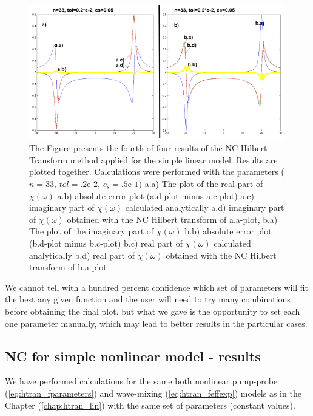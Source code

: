 \documentclass[12pt,twoside,a4paper]{article}
\numberwithin{equation}{subsection}
\numberwithin{figure}{subsection}
\begin{document}
\begin{figure}
  \includegraphics[width=150mm]{img/nc_lin4.png}
  \caption{The Figure presents the fourth of four results of the NC Hilbert Transform method applied for the simple linear model. Results are plotted together. Calculations were performed with the parameters ($n = 33, \, tol = \mbox{.2e-2}, \, c_s = \mbox{.5e-1}) $
    a.a) The plot of the real part of $\chi (\omega )$
    a.b) absolute error plot (a.d-plot minus a.c-plot) 
    a.c) imaginary part of $\chi (\omega )$ calculated analytically 
    a.d) imaginary part of $\chi (\omega )$ obtained with the NC Hilbert transform of a.a-plot,
    b.a) The plot of the imaginary part of $\chi (\omega )$
    b.b) absolute error plot (b.d-plot minus b.c-plot) 
    b.c) real part of $\chi (\omega )$ calculated analytically 
    b.d) real part of $\chi (\omega )$ obtained with the NC Hilbert transform of b.a-plot
    \label{fig:nc_lin4} 
    }
\end{figure}

We cannot tell with a hundred percent confidence which set of parameters will fit the best any given function and the user will need to try many combinations before obtaining the final plot, but what we gave is the opportunity to set each one parameter manually, which may lead to better results in the particular cases.

\subsection{NC for simple nonlinear model - results} \label{chap:nc_nlo}

We have performed calculations for the same both nonlinear pump-probe (\ref{eq:htran_fparameters}) and wave-mixing (\ref{eq:htran_feffexp}) models as in the Chapter (\ref{chap:htran_lin}) with the same set of parameters (constant values).
\end{document}
